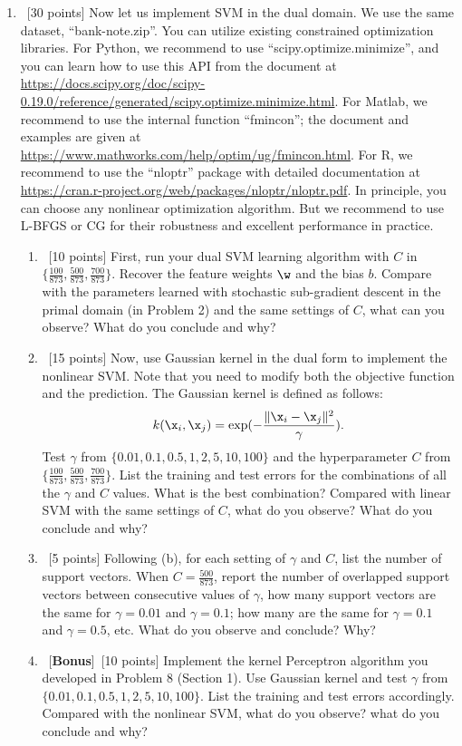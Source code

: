 \documentclass[12pt, fullpage,letterpaper]{article}
\begin{document}
\begin{enumerate}
\item~[30 points] Now let us implement SVM in the dual domain. We use the same dataset, ``bank-note.zip''. You can utilize existing constrained optimization libraries. For Python, we recommend to use ``scipy.optimize.minimize'', and you can learn how to use this API from the document at \url{https://docs.scipy.org/doc/scipy-0.19.0/reference/generated/scipy.optimize.minimize.html}.
For Matlab, we recommend to use the internal function ``fmincon''; the document and examples are given at \url{https://www.mathworks.com/help/optim/ug/fmincon.html}. For R, we recommend to use the ``nloptr'' package with detailed documentation at \url{https://cran.r-project.org/web/packages/nloptr/nloptr.pdf}. In principle, you can choose any nonlinear optimization algorithm. But we recommend to use L-BFGS or CG for their robustness and excellent performance in practice. 

\begin{enumerate}
	\item ~[10 points] First, run your dual SVM learning algorithm with   $C$ in $\{\frac{100}{873}, \frac{500}{873}, \frac{700}{873}\}$. Recover the feature weights $\w$ and the bias $b$. Compare with the parameters learned with stochastic sub-gradient descent in the primal domain (in Problem 2) and the same settings of $C$, what can you observe? What do you conclude and why?
	
	\item~[15 points] Now, use Gaussian kernel in the dual form to implement the nonlinear SVM. Note that you need to modify both the objective function and the prediction. The Gaussian kernel is defined as follows:
	\[
	k(\x_i, \x_j) = \exp(-\frac{\|\x_i - \x_j\|^2}{\gamma}).
	\]
	Test $\gamma$ from $\{0.01, 0.1, 0.5, 1, 2, 5, 10, 100\}$ and the hyperparameter $C$ from $\{ \frac{100}{873}, \frac{500}{873},  \frac{700}{873}\}$. List the training and test errors for the combinations of all the $\gamma$ and $C$ values. What is the best combination? Compared with linear SVM with the same settings of $C$, what do you observe? What do you conclude and why?  
	
	\item~[5 points] Following (b), for each setting of $\gamma$ and $C$, list the number of support vectors. When $C = \frac{500}{873}$, report the number of overlapped support vectors between consecutive values of $\gamma$, \ie how many support vectors are the same for $\gamma= 0.01$ and $\gamma = 0.1$; how many are the same for  $\gamma = 0.1$ and $\gamma = 0.5$, etc. What do you observe and conclude? Why?
	
	\item~[\textbf{Bonus}]~[10 points] Implement the kernel Perceptron algorithm you developed in Problem 8 (Section 1). Use Gaussian kernel and test $\gamma$ from $\{0.01, 0.1, 0.5, 1, 2, 5, 10, 100\}$. List the training and test errors accordingly. Compared with the nonlinear SVM, what do you observe? what do you conclude and why?
	
\end{enumerate} 

\end{enumerate}
\end{document}

